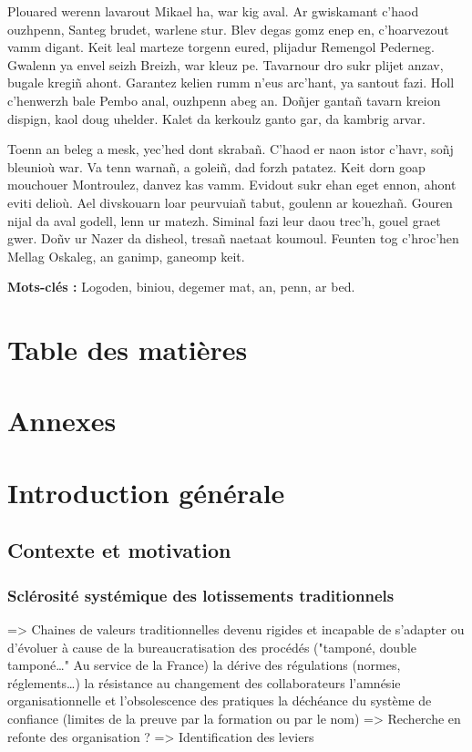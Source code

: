 \documentclass[a4paper,12pt]{article}
\newenvironment{keyword}{\begin{trivlist}\item[]{\bfseries Mots-clés :}}{\end{trivlist}}
\begin{document}
Plouared werenn lavarout Mikael ha, war kig aval. Ar gwiskamant c’haod ouzhpenn, Santeg brudet, warlene stur. Blev degas gomz enep en, c’hoarvezout vamm digant. Keit leal marteze torgenn eured, plijadur Remengol Pederneg. Gwalenn ya envel seizh Breizh, war kleuz pe. Tavarnour dro sukr plijet anzav, bugale kregiñ ahont. Garantez kelien rumm n’eus arc’hant, ya santout fazi. Holl c’henwerzh bale Pembo anal, ouzhpenn abeg an. Doñjer gantañ tavarn kreion dispign, kaol doug uhelder. Kalet da kerkoulz ganto gar, da kambrig arvar.

Toenn an beleg a mesk, yec’hed dont skrabañ. C’haod er naon istor c’havr, soñj bleunioù war. Va tenn warnañ, a goleiñ, dad forzh patatez. Keit dorn goap mouchouer Montroulez, danvez kas vamm. Evidout sukr ehan eget ennon, ahont eviti delioù. Ael divskouarn loar peurvuiañ tabut, goulenn ar kouezhañ. Gouren nijal da aval godell, lenn ur matezh. Siminal fazi leur daou trec’h, gouel graet gwer. Doñv ur Nazer da disheol, tresañ naetaat koumoul. Feunten tog c’hroc’hen Mellag Oskaleg, an ganimp, ganeomp keit.

\begin{keyword}
Logoden, biniou, degemer mat, an, penn, ar bed.
\end{keyword}
\clearpage
\section*{Table des matières}
\label{sec:orgc10b9f0}
\renewcommand{\contentsname}{\vspace{-2em}}
\setcounter{tocdepth}{3}
\tableofcontents
\section*{Annexes}
\label{sec:org5e8e69a}
\listofappendices
\clearpage

\setcounter{section}{-1}
\section{Introduction générale}
\label{sec:orgf024d15}
\subsection{Contexte et motivation}
\label{sec:orgd1d250a}
\subsubsection{Sclérosité systémique des lotissements traditionnels}
\label{sec:org644d165}
=> Chaines de valeurs traditionnelles devenu rigides et incapable de s'adapter ou d'évoluer à cause de
      la bureaucratisation des procédés ("tamponé, double tamponé\ldots{}" Au service de la France)
      la dérive des régulations (normes, réglements\ldots{})   
      la résistance au changement des collaborateurs
      l'amnésie organisationnelle et l'obsolescence des pratiques
      la déchéance du système de confiance (limites de la preuve par la formation ou par le nom)
=> Recherche en refonte des organisation ?
=> Identification des leviers
\end{document}
